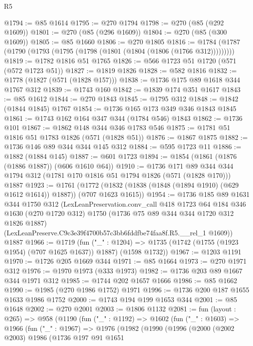\begin{lexlean}{R5}
\begin{coremodule}
@1794 := @85 @1614
@1795 := @270 @1794
@1798 := @270 (@85 (@292 @1609))
@1801 := @270 (@85 (@296 @1609))
@1804 := @270 (@85 (@300 @1609))
@1805 := @85 @1660
@1806 := @270 @1805
@1816 := @1784 (@1787 (@1790 (@1793 (@1795 (@1798 (@1801 (@1804 (@1806 (@1766 @312)))))))))
@1819 := @1782 @1816 @51 @1765
@1826 := @566 @1723 @51 @1720 (@571 (@572 @1723 @51))
@1827 := @1819 @1826
@1828 := @582 @1816
@1832 := @1778 (@1827 (@571 (@1828 @157)))
@1838 := @1736 @175 @89 @1618 @344 @1767 @312
@1839 := @1743 @160
@1842 := @1839 @174 @351 @1617
@1843 := @85 @1612
@1844 := @270 @1843
@1845 := @1795 @312
@1848 := @1842 (@1844 @1845) @1767
@1854 := @1736 @165 @173 @349 @346 @1843 @1845
@1861 := @1743 @162 @164 @347 @344 (@1784 @546) @1843
@1862 := @1736 @101
@1867 := @1862 @148 @344 @346 @1783 @546
@1875 := @1781 @51 @1816 @51 @1783 @1826 (@571 (@1828 @51))
@1876 := @1867 @1875
@1882 := @1736 @146 @89 @344 @344 @145 @312
@1884 := @595 @1723 @11
@1886 := @1882 (@1884 @145)
@1887 := @601 @1723
@1894 := @1854 (@1861 (@1876 (@1886 @1887)) (@606 @1610 @64))
@1910 := @1736
    @171
    @89
    @344
    @344
    @1794
    @312
    (@1781 @170 @1816 @51 @1794 @1826 (@571 (@1828 @170)))
    @1887
@1923 := @1761
    (@1772 (@1832 (@1838 (@1848 (@1894 @1910) (@629 @1612 @1614)) @1887)) (@707 @1623 @1615))
@1954 := @1736
    @185
    @89
    @1631
    @344
    @1750
    @312
    (LexLeanPreservation.conv_call
      @418
      @1723
      @64
      @184
      @346
      @1630
      (@270 @1720 @312)
      @1750
      (@1736 @75 @89 @344 @344 @1720 @312 @1826 @1887)
      (LexLeanPreserve.C9c3e39f4700b57c3bb6fddfbe74faa8f.R5.__rel_1 @1609))
    @1887
@1966 := @1719
    (fun ("_" : @1204) =>
    @1735 (@1742 (@1755 (@1923 @1954) (@707 @1625 @1637)) @1887) (@1598 @1732))
@1967 := @1203 @1191
@1970 := @1726 @205 @1669 @344
@1971 := @85 @1664
@1973 := @270 @1971 @312
@1976 := @1970 @1973 (@333 @1973)
@1982 := @1736 @203 @89 @1667 @344 @1971 @312
@1985 := @1744 @202 @1657 @1666
@1986 := @85 @1662
@1990 := @1985 (@270 @1986 @1752) @1971
@1996 := @1736 @200 @187 @1655 @1633 @1986 @1752
@2000 := @1743 @194 @199 @1653 @344
@2001 := @85 @1648
@2002 := @270 @2001
@2003 := @1806 @1132
@2081 := fun (layout : @265) =>
  @958
    (@1190
      (fun ("_" : @1192) =>
      @1602
        (fun ("_" : @1603) =>
        @1966
          (fun ("_" : @1967) =>
          @1976
            (@1982
              (@1990
                (@1996
                  (@2000
                    (@2002 @2003)
                    @1986
                    (@1736
                      @197
                      @91
                      @1651

\end{coremodule}
\end{lexlean}
